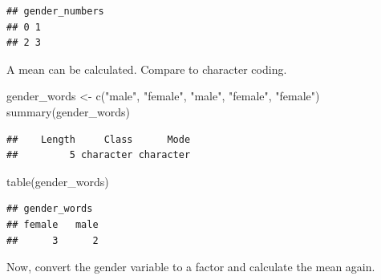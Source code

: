 \documentclass[
]{book}
\newenvironment{Shaded}{\begin{snugshade}}{\end{snugshade}}
\newcommand{\AttributeTok}[1]{\textcolor[rgb]{0.77,0.63,0.00}{#1}}
\newcommand{\FunctionTok}[1]{\textcolor[rgb]{0.00,0.00,0.00}{#1}}
\newcommand{\NormalTok}[1]{#1}
\newcommand{\OtherTok}[1]{\textcolor[rgb]{0.56,0.35,0.01}{#1}}
\newcommand{\SpecialCharTok}[1]{\textcolor[rgb]{0.00,0.00,0.00}{#1}}
\newcommand{\StringTok}[1]{\textcolor[rgb]{0.31,0.60,0.02}{#1}}
\begin{document}
\begin{verbatim}
## gender_numbers
## 0 1 
## 2 3
\end{verbatim}

A mean can be calculated. Compare to character coding.

\begin{Shaded}
\begin{Highlighting}[]
\NormalTok{gender\_words }\OtherTok{\textless{}{-}} \FunctionTok{c}\NormalTok{(}\StringTok{"male"}\NormalTok{, }\StringTok{"female"}\NormalTok{, }\StringTok{"male"}\NormalTok{, }\StringTok{"female"}\NormalTok{, }\StringTok{"female"}\NormalTok{)}
\FunctionTok{summary}\NormalTok{(gender\_words)}
\end{Highlighting}
\end{Shaded}

\begin{verbatim}
##    Length     Class      Mode 
##         5 character character
\end{verbatim}

\begin{Shaded}
\begin{Highlighting}[]
\FunctionTok{table}\NormalTok{(gender\_words)}
\end{Highlighting}
\end{Shaded}

\begin{verbatim}
## gender_words
## female   male 
##      3      2
\end{verbatim}

Now, convert the gender variable to a factor and calculate the mean again.

\begin{Shaded}
\end{Shaded}
\end{document}
